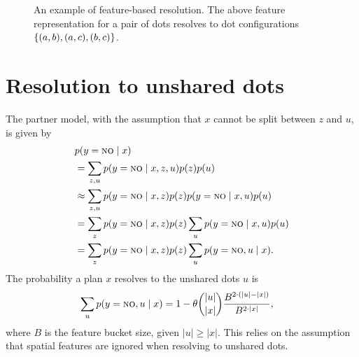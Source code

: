 \documentclass[11pt]{article}
\begin{document}
\begin{figure}[t]
\setlength{\abovecaptionskip}{0pt}

\centering

\vspace{1em}
\caption{
An example of feature-based resolution.
The above feature representation for a pair of dots
resolves to dot configurations $\left\{(a,b), (a,c), (b,c)\right\}$.
}
\label{fig:resolution-example}
\end{figure}

\section{Resolution to unshared dots}
\label{sec:unshared-marginal}
The partner model, with the assumption that
$x$ cannot be split between $z$ and $u$,
is given by
\begin{align*}
&p(y=\textsc{no} \mid x)\\
&= \sum_{z,u}p(y = \textsc{no} \mid x,z,u)p(z)p(u)\\
&\approx \sum_{z,u}p(y=\textsc{no} \mid x,z)p(z) p(y=\textsc{no} \mid  x,u)p(u)\\
&= \sum_z p(y=\textsc{no} \mid x,z)p(z) \sum_u p(y=\textsc{no} \mid  x,u)p(u)\\
&= \sum_z p(y=\textsc{no} \mid x,z)p(z) \sum_u p(y=\textsc{no},u \mid  x).
\end{align*}
The probability a plan $x$ resolves to the unshared dots $u$ is
\begin{align*}
\sum_u p(y=\textsc{no},u \mid x)
&= 1-\theta {|u|\choose|x|}\frac{B^{2 \cdot (|u|-|x|)}}{B^{2\cdot|x|}},
\end{align*}
where $B$ is the feature bucket size,
given $|u| \ge |x|$.
This relies on the assumption that spatial features are ignored when resolving to unshared dots.
\end{document}
